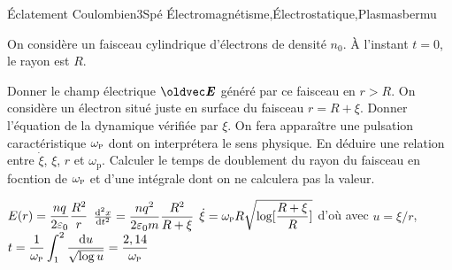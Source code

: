 
\begin{exercise}{\'Eclatement Coulombien}{3}{Spé}
{\'Electromagnétisme,\'Electrostatique,Plasmas}{bermu}

On considère un faisceau cylindrique d'électrons de densité $n_0$. \`A l'instant $t=0$, le rayon est $R$.


\begin{questions}
    \question Donner le champ électrique $\vE$ généré par ce faisceau en $r > R$.
    \question On considère un électron situé juste en surface du faisceau $r = R + \xi$. Donner l'équation de la dynamique vérifiée par $\xi$. On fera apparaître une pulsation caractéristique $\omega_\textsc{p}$ dont on interprétera le sens physique.
    \question En déduire une relation entre $\dot{\xi}$,  $\xi$, $r$ et $\omega_\text{p}$.
    \question Calculer le temps de doublement du rayon du faisceau en focntion de $\omega_\textsc{p}$ et d'une intégrale dont on ne calculera pas la valeur.
\end{questions}


\end{exercise}

\begin{solution}
    \begin{questions}
        \question $E(r) = \dfrac{n q}{2\varepsilon_0} \dfrac{R^2}{r}$
        \question $\dv[2]{x}{t} = \dfrac{n q^2}{2\varepsilon_0 m} \dfrac{R^2}{R + \xi}$
        \question $\dot{\xi} = \omega_\textsc{p} R \sqrt{\log[\dfrac{R+\xi}{R}]}$
        \question d'où avec $u = \xi/r$, $t = \dfrac1{\omega_\textsc{p}} \displaystyle\int_1^{2} \dfrac{\dd{u}}{\sqrt{\log u}} = \dfrac{2,14}{\omega_\textsc{p}}$
    \end{questions}
\end{solution}
